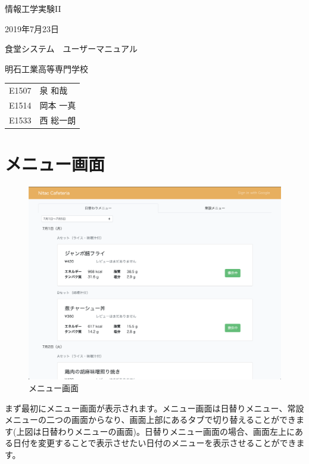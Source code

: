 \documentclass[a4paper]{jsarticle}
\begin{document}

\large
\vspace{-5.0cm}
\hspace{-1.0cm}
情報工学実験II

\hspace{-1.0cm}
2019年7月23日

\Huge
\vspace{1.0cm}
\begin{center}
  食堂システム　ユーザーマニュアル
\end{center}

\vspace{0.5cm}
\begin{center}
  \LARGE
  明石工業高等専門学校
\end{center}

\LARGE
\begin{center}
  \begin{tabular}{rl}
    E1507 & 泉 和哉 \\
    E1514 & 岡本 一真 \\
    E1533 & 西 総一朗
  \end{tabular}
\end{center}

\normalsize

\tableofcontents
\thispagestyle{empty}
\clearpage
\setcounter{page}{1}

\section{メニュー画面}
\begin{figure}[htbp]
	\centering
    \caption{メニュー画面}
	\includegraphics[scale = 0.22525]{image/menu.png}
\end{figure}
まず最初にメニュー画面が表示されます。メニュー画面は日替りメニュー、常設メニューの二つの画面からなり、画面上部にあるタブで切り替えることができます(上図は日替わりメニューの画面)。日替りメニュー画面の場合、画面左上にある日付を変更することで表示させたい日付のメニューを表示させることができます。
\newpage
\end{document}
